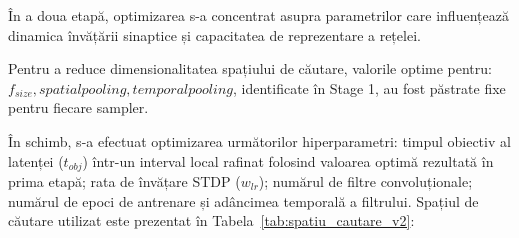 În a doua etapă, optimizarea s-a concentrat asupra parametrilor care influențează dinamica învățării sinaptice și capacitatea de reprezentare a rețelei.

Pentru a reduce dimensionalitatea spațiului de căutare, valorile optime pentru: $f_{size}, spatial pooling, temporal pooling$, identificate în Stage 1, au fost păstrate fixe pentru fiecare sampler.

În schimb, s-a efectuat optimizarea următorilor hiperparametri: timpul obiectiv al latenței ($t_{obj}$) într-un interval local rafinat folosind valoarea optimă rezultată în prima etapă; rata de învățare STDP ($w_{lr}$); numărul de filtre convoluționale; numărul de epoci de antrenare și adâncimea temporală a filtrului. Spațiul de căutare utilizat este prezentat în Tabela~\ref{tab:spatiu_cautare_v2}:

\begin{table}[htbp]
	\centering
	\caption{Definirea spațiului secundar de căutare pentru optimizarea hiperparametrilor în Stage 2}
	\label{tab:spatiu_cautare_v2}
\end{table}

